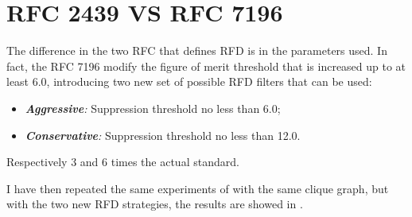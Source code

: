 
\section{RFC 2439 VS RFC 7196}
\label{sec:bgp_rfd_comparison}

The difference in the two \ac{RFC} that defines \ac{RFD} \cite{rfc2439,rfc7196}
is in the parameters used.
In fact, the \ac{RFC} \num{7196} modify the figure
of merit threshold that is increased up to at least \num{6.0}, introducing
two new set of possible \ac{RFD} filters that can be used:
\begin{itemize}
	\item \textit{\textbf{Aggressive}:} Suppression threshold no less than \num{6.0};
	\item \textit{\textbf{Conservative}:} Suppression threshold no less than \num{12.0}.
\end{itemize}

Respectively \num{3} and \num{6} times the actual standard.

I have then repeated the same experiments of  with the same
clique graph, but with the two new \ac{RFD} strategies, the results are
showed in .


